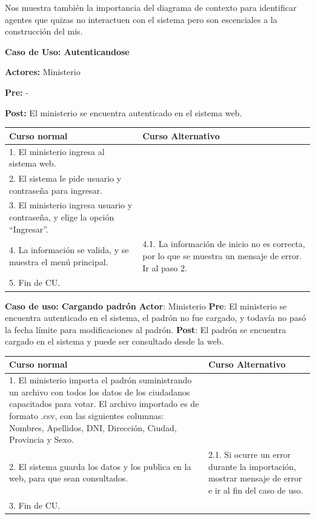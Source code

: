 Nos muestra también la importancia del diagrama de contexto para identificar agentes que quizas no interactuen con el sistema pero son escenciales a la construcción del mis.

\textbf{Caso de Uso: Autenticandose}

\textbf{Actores:} Ministerio

\textbf{Pre:} -

\textbf{Post:} El ministerio se encuentra autenticado en el sistema web.
\begin{table}[h!]
	
 \begin{tabular}{|p{7.5cm} | p{7.5cm}|} 
 \hline
 \textbf{Curso normal} & \textbf{Curso Alternativo} \\
 \hline
 1. El ministerio ingresa al sistema web. & \\
 \hline
 
 2. El sistema le pide usuario y contraseña para ingresar. & \\
 \hline 
 3. El ministerio ingresa usuario y contraseña, y elige la opción “Ingresar”. & \\
 \hline 
 4. La información se valida, y se muestra el menú principal. & 
4.1. La información de inicio no es correcta, por lo que se muestra un mensaje de error. Ir al paso 2.
\\
 \hline 
 5. Fin de CU. & \\

 \hline
 \end{tabular}

\end{table}


\textbf{Caso de uso: Cargando padrón}
\textbf{Actor}: Ministerio
\textbf{Pre}: El ministerio se encuentra autenticado en el sistema, el padrón no fue cargado, y todavía no pasó la fecha límite para modificaciones al padrón.
\textbf{Post}: El padrón se encuentra cargado en el sistema y puede ser consultado desde la web.
\begin{table}[h!]
	
 \begin{tabular}{|p{7.5cm} | p{7.5cm}|} 
 \hline
 \textbf{Curso normal} & \textbf{Curso Alternativo} \\
 \hline
1. El ministerio importa el padrón suministrando un archivo con todos los datos de los ciudadanos capacitados para votar.
El archivo importado es de formato .csv, con las siguientes columnas: Nombres, Apellidos, DNI, Dirección, Ciudad, Provincia y Sexo. & \\
\hline

2. El sistema guarda los datos y los publica en la web, para que sean consultados. &
2.1. Si ocurre un error durante la importación, mostrar mensaje de error e ir al fin del caso de uso. \\
\hline
3. Fin de CU. & \\

 \end{tabular}

\end{table}





